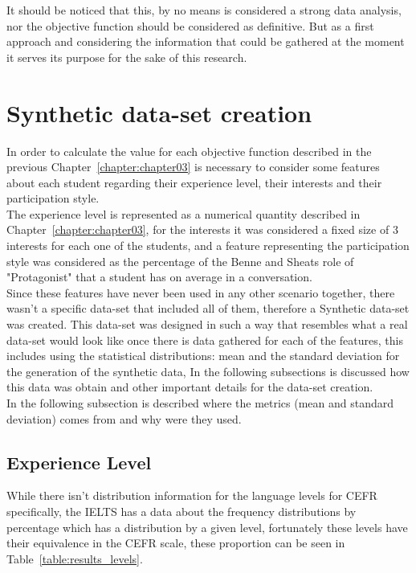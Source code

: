 It should be noticed that this, by no means is considered a strong data analysis, nor the objective function should be considered as definitive. But as a first approach and considering the information that could be gathered at the moment it serves its purpose for the sake of this research.\\

\section{Synthetic data-set creation}

In order to calculate the value for each objective function described in the previous Chapter~\ref{chapter:chapter03} is necessary to consider some features about each student regarding their experience level, their interests and their participation style.\\

The experience level is represented as a numerical quantity described in Chapter~\ref{chapter:chapter03}, for the interests it was considered a fixed size of 3 interests for each one of the students, and a feature representing the participation style was considered as the percentage of the Benne and Sheats role \cite{FunctionalRoles} of "Protagonist" that a student has on average in a conversation.\\

Since these features have never been used in any other scenario together, there wasn't a specific data-set that included all of them, therefore a Synthetic data-set was created. This data-set was designed in such a way that resembles what a real data-set would look like once there is data gathered for each of the features, this includes using the statistical distributions: mean and the standard deviation for the generation of the synthetic data, In the following subsections is discussed how this data was obtain and other important details for the data-set creation.\\

In the following subsection is described where the metrics (mean and standard deviation) comes from and why were they used.\\

\subsection{Experience Level} 

While there isn't distribution information for the language levels for CEFR specifically, the IELTS has a data about the frequency distributions by percentage \cite{ielts_demographic_data_2018} which has a distribution by a given level, fortunately these levels have their equivalence in the CEFR scale, these proportion can be seen in Table~\ref{table:results_levels}.\\

